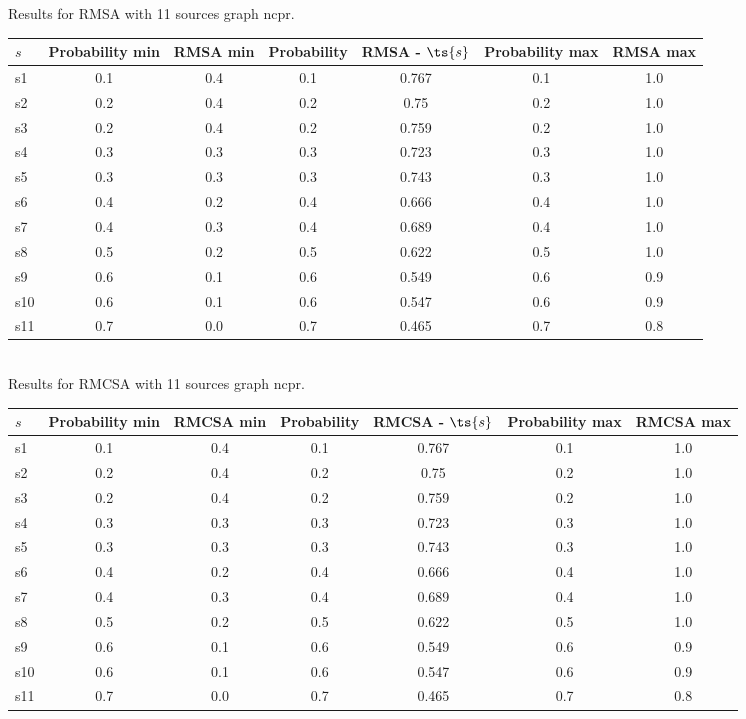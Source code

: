 \documentclass{article}
\begin{document}
\noindent Results for RMSA with 11 sources graph ncpr.

\noindent\begin{tabular}{|l|c|c|c|c|c|c|}
\hline
$s$& Probability min & RMSA min & Probability & RMSA - $\ts{s}$ & Probability max & RMSA max\\
\hline
s1 &0.1 & 0.4 & 0.1 & 0.767 & 0.1 & 1.0\\
\hline
s2 &0.2 & 0.4 & 0.2 & 0.75 & 0.2 & 1.0\\
\hline
s3 &0.2 & 0.4 & 0.2 & 0.759 & 0.2 & 1.0\\
\hline
s4 &0.3 & 0.3 & 0.3 & 0.723 & 0.3 & 1.0\\
\hline
s5 &0.3 & 0.3 & 0.3 & 0.743 & 0.3 & 1.0\\
\hline
s6 &0.4 & 0.2 & 0.4 & 0.666 & 0.4 & 1.0\\
\hline
s7 &0.4 & 0.3 & 0.4 & 0.689 & 0.4 & 1.0\\
\hline
s8 &0.5 & 0.2 & 0.5 & 0.622 & 0.5 & 1.0\\
\hline
s9 &0.6 & 0.1 & 0.6 & 0.549 & 0.6 & 0.9\\
\hline
s10 &0.6 & 0.1 & 0.6 & 0.547 & 0.6 & 0.9\\
\hline
s11 &0.7 & 0.0 & 0.7 & 0.465 & 0.7 & 0.8\\
\hline
\end{tabular}\\

\noindent Results for RMCSA with 11 sources graph ncpr.

\noindent\begin{tabular}{|l|c|c|c|c|c|c|}
\hline
$s$& Probability min & RMCSA min & Probability & RMCSA - $\ts{s}$ & Probability max & RMCSA max\\
\hline
s1 &0.1 & 0.4 & 0.1 & 0.767 & 0.1 & 1.0\\
\hline
s2 &0.2 & 0.4 & 0.2 & 0.75 & 0.2 & 1.0\\
\hline
s3 &0.2 & 0.4 & 0.2 & 0.759 & 0.2 & 1.0\\
\hline
s4 &0.3 & 0.3 & 0.3 & 0.723 & 0.3 & 1.0\\
\hline
s5 &0.3 & 0.3 & 0.3 & 0.743 & 0.3 & 1.0\\
\hline
s6 &0.4 & 0.2 & 0.4 & 0.666 & 0.4 & 1.0\\
\hline
s7 &0.4 & 0.3 & 0.4 & 0.689 & 0.4 & 1.0\\
\hline
s8 &0.5 & 0.2 & 0.5 & 0.622 & 0.5 & 1.0\\
\hline
s9 &0.6 & 0.1 & 0.6 & 0.549 & 0.6 & 0.9\\
\hline
s10 &0.6 & 0.1 & 0.6 & 0.547 & 0.6 & 0.9\\
\hline
s11 &0.7 & 0.0 & 0.7 & 0.465 & 0.7 & 0.8\\
\hline
\end{tabular}\\
\end{document}

